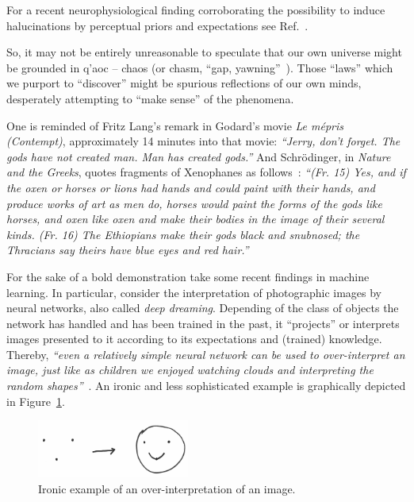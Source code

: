 For a recent neurophysiological finding corroborating
the possibility to induce halucinations by perceptual priors and expectations see Ref.~\cite{Powers596}.


So, it may not be entirely unreasonable to speculate that our own universe might be grounded in
\textgreek{q'aoc} --  chaos (or  chasm, ``gap, yawning''~\cite[p.~3]{gantz-earlyGreekMyth}).
Those ``laws'' which we purport to ``discover'' might be spurious reflections of our own minds,
desperately attempting to ``make sense'' of the phenomena.

One is reminded of Fritz Lang's remark in Godard's movie {\em Le m\'epris (Contempt)}, approximately 14 minutes into that movie:
{\em ``Jerry, don't forget. The gods have not created man. Man has created gods.''}
And Schr\"odinger,   in  {\em Nature and the Greeks},
quotes fragments of Xenophanes  as follows~\cite[p.~71]{schroed:natgr}:
{\em ``(Fr. 15) Yes, and if the oxen or horses or lions had hands
and could paint with their hands, and produce works of art
as men do, horses would paint the forms of the gods like
horses, and oxen like oxen and make their bodies in the
image of their several kinds.
(Fr. 16) The Ethiopians make their gods black and snubnosed;
the Thracians say theirs have blue eyes and red hair.''}

For the sake of a bold demonstration take some recent findings in machine learning.
In particular, consider
the interpretation of photographic images by neural networks,
also called {\em deep dreaming}.
Depending of the class of objects the network has handled and has been trained in the past,
it ``projects'' or interprets images presented to it according to its expectations and (trained) knowledge.
Thereby,
{\em ``even a relatively simple neural network can be used to over-interpret an image,
just like as children we enjoyed watching clouds and interpreting the random shapes''}~\cite{google-deepdreaming-over}.
An ironic and less sophisticated example is
graphically depicted in Figure~\ref{2016-pu-book-chapter-pu-figure-deepdreaming}.
\begin{figure}
\begin{center}
\includegraphics[width=5cm,angle=0]{2016-pu-book-chapter-pu-figure-deepdreaming}
\end{center}
\caption{
Ironic example of an over-interpretation of an image.
\label{2016-pu-book-chapter-pu-figure-deepdreaming}
}
\end{figure}
